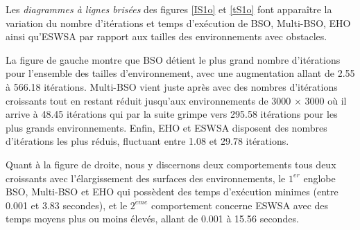 	Les \textit{diagrammes à lignes brisées} des figures \ref{IS1o} et \ref{tS1o} font apparaître la variation du nombre d'itérations et temps d'exécution de BSO, Multi-BSO, EHO ainsi qu'ESWSA par rapport aux tailles des environnements avec obstacles.\\
	\vspace{-0.2cm}
	
	La figure de gauche montre que BSO détient le plus grand nombre d'itérations pour l'ensemble des tailles d'environnement, avec une augmentation allant de 2.55 à 566.18 itérations. Multi-BSO vient juste après avec des nombres d'itérations croissants tout en restant réduit jusqu'aux environnements de 3000 $\times$ 3000 où il arrive à 48.45 itérations qui par la suite grimpe vers 295.58 itérations pour les plus grands environnements.
	Enfin, EHO et ESWSA disposent des nombres d'itérations les plus réduis, fluctuant entre 1.08 et 29.78 itérations.\\
	\vspace{-0.2cm}
	
	Quant à la figure de droite, nous y discernons deux comportements tous deux croissants avec l'élargissement des surfaces des environnements, le $1^{er}$ englobe BSO, Multi-BSO et EHO qui possèdent des temps d'exécution minimes (entre 0.001 et 3.83 secondes), et le $2^{\grave{e}me}$ comportement concerne ESWSA avec des temps moyens plus ou moins élevés, allant de 0.001 à 15.56 secondes.
	
	
	
	\noindent
	\hspace{-0.3cm}
	\begin{minipage}[t]{0.55\textwidth}
		\captionsetup{width=0.8\linewidth}
		\centering{}
		\label{IS1o}
	\end{minipage}\hfill
	\hspace{-0.5cm}
	\begin{minipage}[t]{0.55\textwidth}
		\captionsetup{width=0.8\linewidth}
		\centering{}
		\label{tS1o}
	\end{minipage}\hfill
	
